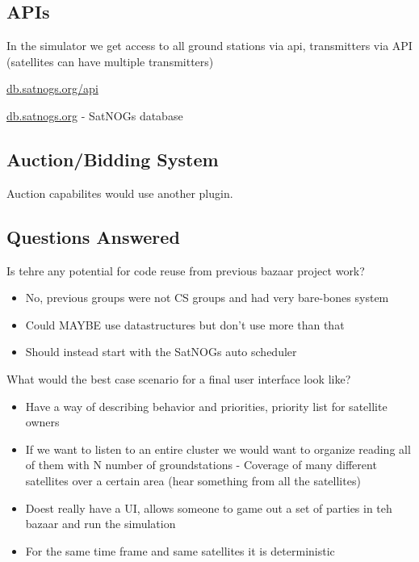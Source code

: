 \documentclass{article}
\begin{document}
\subsection{APIs}

In the simulator we get access to all ground stations via api, transmitters via API (satellites can have multiple transmitters)

\href{db.satnogs.org/api}{db.satnogs.org/api}

\href{db.satnogs.org}{db.satnogs.org} - SatNOGs database


\subsection{Auction/Bidding System}

Auction capabilites would use another plugin.


\subsection{Questions Answered}

Is tehre any potential for code reuse from previous bazaar project work?

\begin{itemize}
  \item No, previous groups were not CS groups and had very bare-bones system
  \item Could MAYBE use datastructures but don't use more than that
  \item Should instead start with the SatNOGs auto scheduler
\end{itemize}

What would the best case scenario for a final user interface look like?

\begin{itemize}
  \item Have a way of describing behavior and priorities, priority list for satellite owners
  \item If we want to listen to an entire cluster we would want to organize reading all of them with N number of groundstations - Coverage of many different satellites over a certain area (hear something from all the satellites)
  \item Doest really have a UI, allows someone to game out a set of parties in teh bazaar and run the simulation
  \item For the same time frame and same satellites it is deterministic
\end{itemize}
\end{document}
